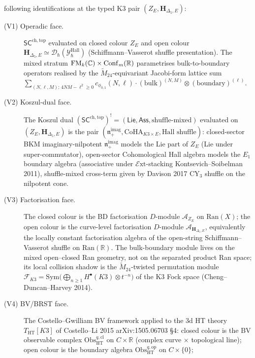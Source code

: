 \begin{theorem}
following identifications at the typed K3 pair
$(Z_E,\mathbf H_{\Delta_5,E})$:
\begin{description}
 \item[(V1) Operadic face.] $\mathsf{SC}^{\mathrm{ch,top}}$ evaluated on
 closed colour $Z_E$ and open colour
 $\mathbf H_{\Delta_5,E}\simeq
 \mathcal{D}_\hbar(\mathcal{Y}^{\mathrm{Hall}}_\hbar)$
 (Schiffmann--Vasserot shuffle presentation). The mixed stratum
 $\mathrm{FM}_k(\mathbb{C})\times \mathrm{Conf}_m(\mathbb{R})$ parametrises
 bulk-to-boundary operators realised by the $\widetilde{M}_{24}$-equivariant
 Jacobi-form lattice sum
 $\sum_{(N, \ell, M):\,4 NM - \ell^2 \geq 0} c_{\phi_{0, 1}}(N, \ell)
 \cdot (\mathrm{bulk})^{(N, M)} \otimes (\mathrm{boundary})^{(\ell)}$.
 \item[(V2) Koszul-dual face.] The Koszul dual
 $(\mathsf{SC}^{\mathrm{ch,top}})^{!} = (\mathsf{Lie}, \mathsf{Ass},\text{shuffle-mixed})$
 evaluated on $(Z_E,\mathbf H_{\Delta_5,E})$ is the pair
 $(\mathfrak{n}_+^{\mathrm{imag}}, \mathrm{CoHA}_{K3 \times E}, \text{Hall shuffle})$:
 closed-sector BKM imaginary-nilpotent $\mathfrak{n}_+^{\mathrm{imag}}$
 models the Lie part of $Z_E$ (Lie under super-commutator), open-sector
 Cohomological Hall algebra models the $E_1$ boundary algebra
 (associative under $\mathcal{E}\mathrm{xt}$-stacking
 Kontsevich--Soibelman 2011), shuffle-mixed cross-term given by
 Davison 2017 CY$_3$ shuffle on the nilpotent cone.
 \item[(V3) Factorisation face.] The closed colour is the BD
 factorisation $D$-module $\mathcal{A}_{Z_E}$ on
 $\mathrm{Ran}(X)$; the open colour is the curve-level
 factorisation $D$-module $\mathcal{A}_{\mathbf H_{\Delta_5,E}}$,
 equivalently the locally constant factorisation algebra of the
 open-string Schiffmann--Vasserot shuffle on $\mathrm{Ran}(\mathbb{R})$.
 The bulk-boundary
 module lives on the mixed open--closed Ran geometry, not on the
 separated product Ran space; its local collision shadow is
 the $\widetilde{M}_{24}$-twisted permutation module
 $\mathcal{F}_{K3} = \mathrm{Sym}\bigl(\bigoplus_{n \geq 1}
 H^\bullet(K3) \otimes t^{-n}\bigr)$ of the K3 Fock space
 (Cheng--Duncan--Harvey 2014).
 \item[(V4) BV/BRST face.] The Costello--Gwilliam BV framework applied
 to the $3$d HT theory $T_{\mathrm{HT}}[K3]$ of Costello--Li 2015
 arXiv:1505.06703 \S 4: closed colour is the BV observable complex
 $\mathrm{Obs}^{q,\mathrm{cl}}_{\mathrm{HT}}$ on $C \times \mathbb{R}$
 (complex curve $\times$ topological line); open colour is the boundary
 algebra $\mathrm{Obs}^{q,\mathrm{op}}_{\mathrm{HT}}$ on $C \times \{0\}$;

\end{description}
\end{theorem}
